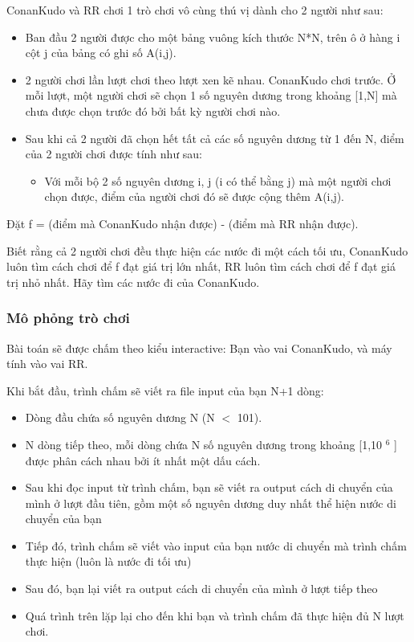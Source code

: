 



   ConanKudo và RR chơi 1 trò chơi vô cùng thú vị dành cho 2 người như sau:  
\begin{itemize}
	\item     Ban đầu 2 người được cho một bảng vuông kích thước N*N, trên ô ở hàng i cột j của bảng có ghi số A(i,j).   
	\item     2 người chơi lần lượt chơi theo lượt xen kẽ nhau. ConanKudo chơi trước. Ở mỗi lượt, một người chơi sẽ chọn 1 số nguyên dương trong khoảng [1,N] mà chưa được chọn trước đó bởi bất kỳ người chơi nào.   
	\item     Sau khi cả 2 người đã chọn hết tất cả các số nguyên dương từ 1 đến N, điểm của 2 người chơi được tính như sau:    
\begin{itemize}
	\item       Với mỗi bộ 2 số nguyên dương i, j (i có thể bằng j) mà một người chơi chọn được, điểm của người chơi đó sẽ được cộng thêm A(i,j).     
\end{itemize}
\end{itemize}

   Đặt f = (điểm mà ConanKudo nhận được) - (điểm mà RR nhận được).  

   Biết rằng cả 2 người chơi đều thực hiện các nước đi một cách tối ưu, ConanKudo luôn tìm cách chơi để f đạt giá trị lớn nhất, RR luôn tìm cách chơi để f đạt giá trị nhỏ nhất. Hãy tìm các nước đi của ConanKudo.  

\subsubsection{   Mô phỏng trò chơi  }

   Bài toán sẽ được chấm theo kiểu interactive: Bạn vào vai ConanKudo, và máy tính vào vai RR.  

   Khi bắt đầu, trình chấm sẽ viết ra file input của bạn N+1 dòng:  
\begin{itemize}
	\item     Dòng đầu chứa số nguyên dương N (N $<$ 101).   
	\item     N dòng tiếp theo, mỗi dòng chứa N số nguyên dương trong khoảng [1,10    $^     6    $    ] được phân cách nhau bởi ít nhất một dấu cách.   
	\item     Sau khi đọc input từ trình chấm, bạn sẽ viết ra output cách di chuyển của mình ở lượt đầu tiên, gồm một số nguyên dương duy nhất thể hiện nước di chuyển của bạn   
	\item     Tiếp đó, trình chấm sẽ viết vào input của bạn nước di chuyển mà trình chấm thực hiện (luôn là nước đi tối ưu)   
	\item     Sau đó, bạn lại viết ra output cách di chuyển của mình ở lượt tiếp theo   
	\item     Quá trình trên lặp lại cho đến khi bạn và trình chấm đã thực hiện đủ N lượt chơi.   
\end{itemize}

